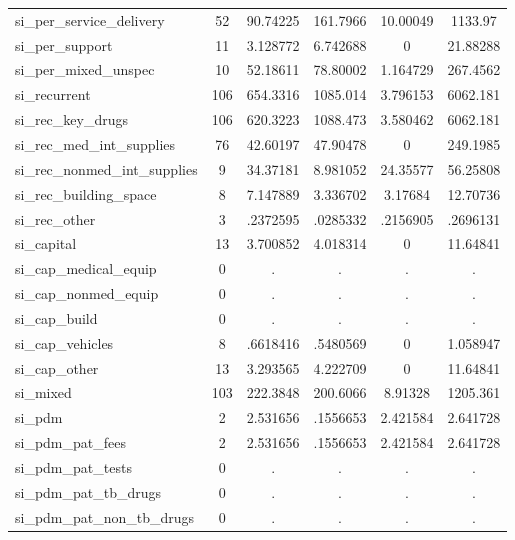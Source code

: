 \begin{table}[htbp]
\begin{tabular}{l*{1}{ccccc}}
si\_per\_service\_delivery&          52&    90.74225&    161.7966&    10.00049&     1133.97\\
si\_per\_support&          11&    3.128772&    6.742688&           0&    21.88288\\
si\_per\_mixed\_unspec&          10&    52.18611&    78.80002&    1.164729&    267.4562\\
si\_recurrent&         106&    654.3316&    1085.014&    3.796153&    6062.181\\
si\_rec\_key\_drugs&         106&    620.3223&    1088.473&    3.580462&    6062.181\\
si\_rec\_med\_int\_supplies&          76&    42.60197&    47.90478&           0&    249.1985\\
si\_rec\_nonmed\_int\_supplies&           9&    34.37181&    8.981052&    24.35577&    56.25808\\
si\_rec\_building\_space&           8&    7.147889&    3.336702&     3.17684&    12.70736\\
si\_rec\_other&           3&    .2372595&    .0285332&    .2156905&    .2696131\\
si\_capital  &          13&    3.700852&    4.018314&           0&    11.64841\\
si\_cap\_medical\_equip&           0&           .&           .&           .&           .\\
si\_cap\_nonmed\_equip&           0&           .&           .&           .&           .\\
si\_cap\_build&           0&           .&           .&           .&           .\\
si\_cap\_vehicles&           8&    .6618416&    .5480569&           0&    1.058947\\
si\_cap\_other&          13&    3.293565&    4.222709&           0&    11.64841\\
si\_mixed    &         103&    222.3848&    200.6066&     8.91328&    1205.361\\
si\_pdm      &           2&    2.531656&    .1556653&    2.421584&    2.641728\\
si\_pdm\_pat\_fees&           2&    2.531656&    .1556653&    2.421584&    2.641728\\
si\_pdm\_pat\_tests&           0&           .&           .&           .&           .\\
si\_pdm\_pat\_tb\_drugs&           0&           .&           .&           .&           .\\
si\_pdm\_pat\_non\_tb\_drugs&           0&           .&           .&           .&           .\\

\end{tabular}
\end{table}
